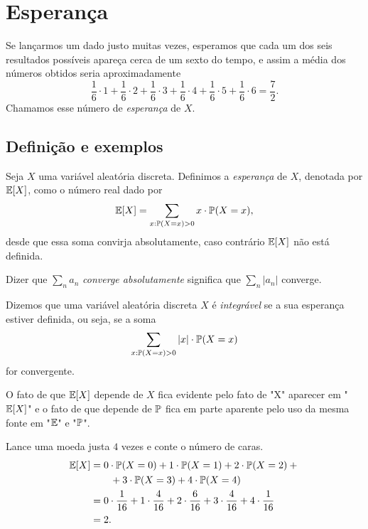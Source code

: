 


\clearpage
\section{Esperança}

Se lançarmos um dado justo muitas vezes, esperamos que cada um dos seis resultados possíveis apareça cerca de um sexto do tempo, e assim a média dos números obtidos seria aproximadamente
\[
\frac{1}{6} \cdot 1 +
\frac{1}{6} \cdot 2 +
\frac{1}{6} \cdot 3 +
\frac{1}{6} \cdot 4 +
\frac{1}{6} \cdot 5 +
\frac{1}{6} \cdot 6
=
\frac{7}{2}
.
\]
Chamamos esse número de \emph{esperança} de $ X $.

\subsection{Definição e exemplos}

\begin{definition}
[Esperança]
Seja $ X $ uma variável aleatória discreta.
Definimos a \emph{esperança} de $ X $, denotada por $ \mathbb{E}[X] $, como o número real dado por
\[
\mathbb{E}[X]
=
\sum_{x : \mathbb{P}(X=x)>0 } x \cdot \mathbb{P}(X=x)
,
\]
desde que essa soma convirja absolutamente, caso contrário $ \mathbb{E}[X] $ não está definida.
\end{definition}

\begin{terminology*}
Dizer que $ \sum_n a_n $ \emph{converge absolutamente} significa que $ \sum_n |a_n| $ converge.
\end{terminology*}

\begin{definition}
[Integrável]
Dizemos que uma variável aleatória discreta $ X $ é \emph{integrável} se a sua esperança estiver definida, ou seja, se a soma
\[
\sum_{x : \mathbb{P}(X=x)>0 } |x| \cdot \mathbb{P}(X=x)
\]
for convergente.
\end{definition}

\begin{notation*}
O fato de que $ \mathbb{E}[X] $ depende de $ X $ fica evidente pelo fato de "X" aparecer em "$ \mathbb{E}[X] $" e o fato de que depende de $ \mathbb{P} $ fica em parte aparente pelo uso da mesma fonte em "$ \mathbb{E} $" e "$ \mathbb{P} $".
\end{notation*}

\begin{example}
\label{example:quatromoedas}
Lance uma moeda justa $ 4 $ vezes e conte o número de caras.
\begin{align}
\mathbb{E}[X] &= 
0 \cdot \mathbb{P}(X=0) +
1 \cdot \mathbb{P}(X=1) +
2 \cdot \mathbb{P}(X=2) + {}
\\ & \quad \quad +
3 \cdot \mathbb{P}(X=3) +
4 \cdot \mathbb{P}(X=4)
\\
&=
0 \cdot \frac{1}{16} + 1 \cdot \frac{4}{16} + 2 \cdot \frac{6}{16} + 3 \cdot \frac{4}{16} + 4 \cdot \frac{1}{16}
\\
&
= 2
.
\end{align}
\end{example}

